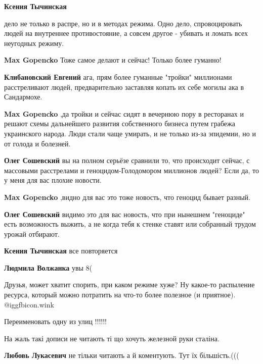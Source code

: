 \begin{itemize}
\begin{itemize} %
\textbf{Ксения Тычинская} 

дело не только в распре, но и в методах режима. Одно дело, спровоцировать людей
на внутреннее противостояние, а совсем другое - убивать и ломать всех неугодных
режиму.

\begin{itemize} %
\textbf{Max Gopencko} Тоже самое делают и сейчас! Только более гуманно!

\textbf{Клибановский Евгений} ага, прям более гуманные "тройки" миллионами расстреливают людей, предварительно заставляя копать их себе могилы ака в Сандармохе.

\textbf{Max Gopencko} ,да тройки и сейчас сидят в вечернюю пору в ресторанах и решают схемы дальнейшего развития собственного бизнеса путем грабежа украинского народа.
Люди стали чаще умирать, и не только из-за эпидемии, но и от голода и болезней.

\textbf{Олег Сошевский} вы на полном серьёзе сравнили то, что происходит сейчас, с массовыми расстрелами и геноцидом-Голодомором миллионов людей? Если да, то у меня для вас плохие новости.

\textbf{Max Gopencko} ,видно для вас это тоже новость, что геноцид бывает разный.

\textbf{Олег Сошевский} видимо это для вас новость, что при нынешнем "геноциде" есть возможность выжить, а не когда тебя к стенке ставят или собранный трудом урожай отбирают.
\end{itemize} %

\textbf{Ксения Тычинская} все повторяется

\textbf{Людмила Волжанка} увы 8(


Друзья, может хватит спорить, при каком режиме хуже? Ну какое-то распыление
ресурса, который можно потратить на что-то более полезное (и приятное).  @igg{fbicon.wink} 
\end{itemize} %

Переименовать одну из улиц !!!!!!

На жаль такі дописи не читають ті що хочуть железной руки сталіна.

\begin{itemize} %
\textbf{Любовь Лукасевич} не тільки читають а й коментують. Тут їх більшість.(((
\end{itemize} %

\end{itemize} %
